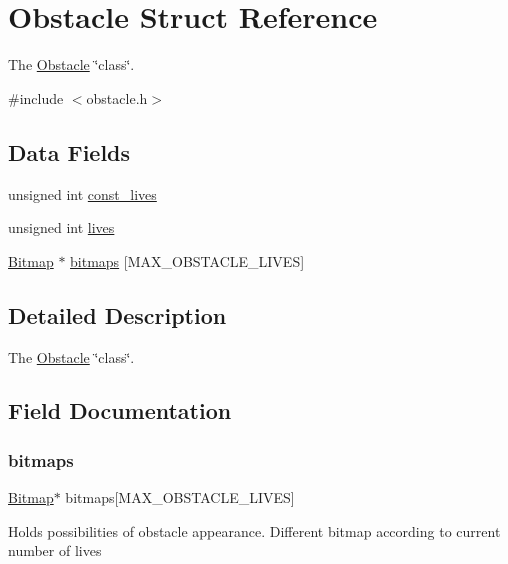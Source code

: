 \hypertarget{struct_obstacle}{}\section{Obstacle Struct Reference}
\label{struct_obstacle}


The \hyperlink{struct_obstacle}{Obstacle} \char`\"{}class\char`\"{}.  




{\ttfamily \#include $<$obstacle.\+h$>$}

\subsection*{Data Fields}
\begin{DoxyCompactItemize}
\item 
unsigned int \hyperlink{struct_obstacle_ab9d581d927d2e11f929ee02052f9eb58}{const\+\_\+lives}
\item 
unsigned int \hyperlink{struct_obstacle_a5b6f67c2402ab532f12e2422ddd2f5e4}{lives}
\item 
\hyperlink{struct_bitmap}{Bitmap} $\ast$ \hyperlink{struct_obstacle_ad89799fda86133fec366bb53373d93b8}{bitmaps} \mbox{[}M\+A\+X\+\_\+\+O\+B\+S\+T\+A\+C\+L\+E\+\_\+\+L\+I\+V\+ES\mbox{]}
\end{DoxyCompactItemize}


\subsection{Detailed Description}
The \hyperlink{struct_obstacle}{Obstacle} \char`\"{}class\char`\"{}. 

\subsection{Field Documentation}
\hypertarget{struct_obstacle_ad89799fda86133fec366bb53373d93b8}{}\label{struct_obstacle_ad89799fda86133fec366bb53373d93b8} 
\subsubsection{\texorpdfstring{bitmaps}{bitmaps}}
{\footnotesize\ttfamily \hyperlink{struct_bitmap}{Bitmap}$\ast$ bitmaps\mbox{[}M\+A\+X\+\_\+\+O\+B\+S\+T\+A\+C\+L\+E\+\_\+\+L\+I\+V\+ES\mbox{]}}

Holds possibilities of obstacle appearance. Different bitmap according to current number of lives \hypertarget{struct_obstacle_ab9d581d927d2e11f929ee02052f9eb58}{}\label{struct_obstacle_ab9d581d927d2e11f929ee02052f9eb58} 
